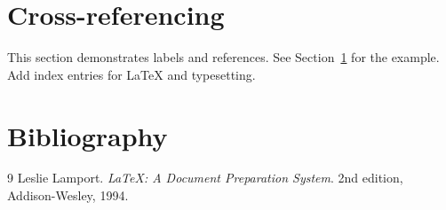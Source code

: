 \documentclass[12pt,a4paper]{article}
\begin{document}
\section{Cross-referencing}
\label{sec:cross-referencing}
This section demonstrates labels and references.
See Section~\ref{sec:cross-referencing} for the example.
Add index entries for LaTeX and typesetting.
\section{Bibliography}
\begin{thebibliography}{9}
Leslie Lamport. \textit{LaTeX: A Document Preparation System}.
2nd edition, Addison-Wesley, 1994.
\end{thebibliography}
\printindex
\end{document}

